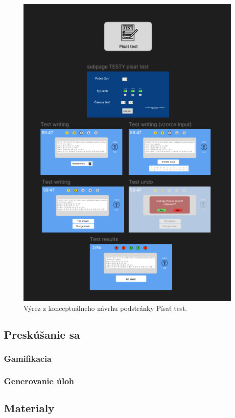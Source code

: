 \begin{figure}[H]
  \centering
  \includegraphics[width=16cm]{img/figma_screen.png}
  \caption{Výrez z konceptuálneho návrhu podstránky Písať test.}
  \label{figmavizual}
\end{figure} 

\subsection{Preskúšanie sa}
\subsubsection{Gamifikacia}
\subsubsection{Generovanie úloh}
\subsection{Materialy}
